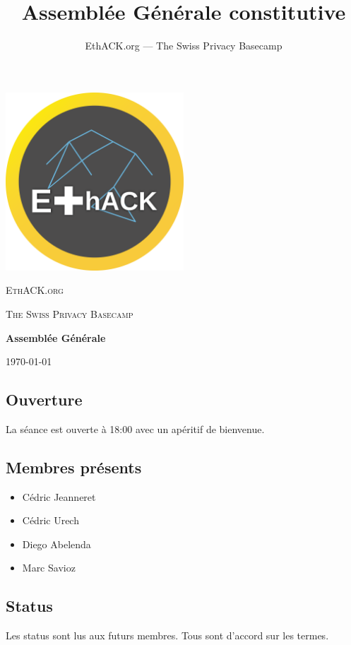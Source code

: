 \documentclass[12pt,twoside]{report}
\author{EthACK.org — The Swiss Privacy Basecamp}
\title{Assemblée Générale constitutive}
\begin{document}
\begin{titlepage}
\centering
\includegraphics[width=0.50\textwidth]{../logo-4096.png}\par\vspace{2cm}
{\scshape\LARGE EthACK.org \par}
\vspace{1cm}
{\scshape\Large The Swiss Privacy Basecamp \par}
\vspace{1.5cm}
{\huge\bfseries Assemblée Générale\par}

\vfill
{\large \today\par}
\end{titlepage}
\setlength{\parindent}{0cm}

\subsection*{Ouverture}
La séance est ouverte à 18:00 avec un apéritif de bienvenue.

\subsection*{Membres présents}
\begin{itemize}
\item Cédric Jeanneret
\item Cédric Urech
\item Diego Abelenda
\item Marc Savioz
\end{itemize}

\subsection*{Status}
Les status sont lus aux futurs membres. Tous sont d'accord sur les termes.
\end{document}
